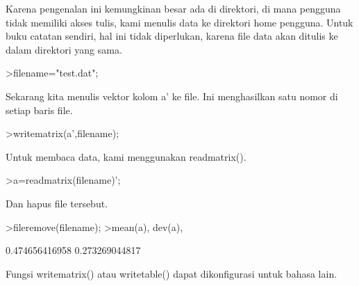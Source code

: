 \documentclass[a4paper,10pt]{article}
\begin{document}
\begin{eulernotebook}
\begin{eulercomment}
\begin{eulercomment}
\begin{eulercomment}
Karena pengenalan ini kemungkinan besar ada di direktori, di mana
pengguna tidak memiliki akses tulis, kami menulis data ke direktori
home pengguna. Untuk buku catatan sendiri, hal ini tidak diperlukan,
karena file data akan ditulis ke dalam direktori yang sama.
\end{eulercomment}
\begin{eulerprompt}
>filename="test.dat";
\end{eulerprompt}
\begin{eulercomment}
Sekarang kita menulis vektor kolom a' ke file. Ini menghasilkan satu
nomor di setiap baris file.
\end{eulercomment}
\begin{eulerprompt}
>writematrix(a',filename);
\end{eulerprompt}
\begin{eulercomment}
Untuk membaca data, kami menggunakan readmatrix().
\end{eulercomment}
\begin{eulerprompt}
>a=readmatrix(filename)';
\end{eulerprompt}
\begin{eulercomment}
Dan hapus file tersebut.
\end{eulercomment}
\begin{eulerprompt}
>fileremove(filename);
>mean(a), dev(a),
\end{eulerprompt}
\begin{euleroutput}
  0.474656416958
  0.273269044817
\end{euleroutput}
\begin{eulercomment}
Fungsi writematrix() atau writetable() dapat dikonfigurasi untuk
bahasa lain.


\end{eulercomment}
\end{eulercomment}
\end{eulercomment}
\end{eulernotebook}
\end{document}
